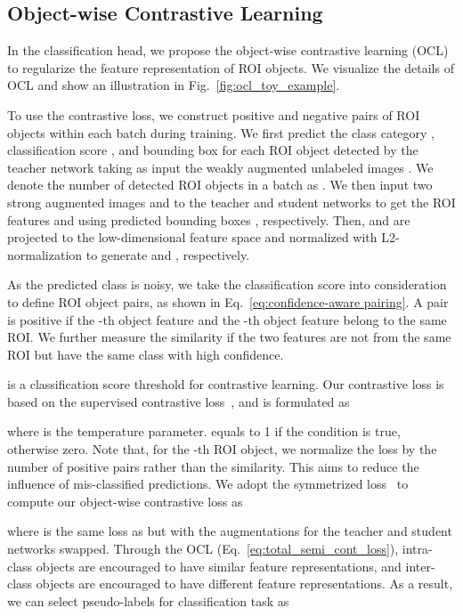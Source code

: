\documentclass{bmvc2k}
\begin{document}
\subsection{Object-wise Contrastive Learning}
\label{sec:contrastive}
In the classification head, we propose the object-wise contrastive learning (OCL) to regularize the feature representation of ROI objects. 
We visualize the details of OCL and show an illustration in Fig.~\ref{fig:ocl_toy_example}. 

To use the contrastive loss, we construct positive and negative pairs of ROI objects within each batch during training.
We first predict the class category , classification score , and bounding box  for each ROI object detected by the teacher network taking as input the weakly augmented unlabeled images . We denote the number of detected ROI objects in a batch as .
We then input two strong augmented images  and  to the teacher and student networks to get the ROI features  and  using predicted bounding boxes , respectively.
Then,  and  are projected to the low-dimensional feature space
and normalized with L2-normalization to generate  and , respectively.

As the predicted class is noisy, we take the classification score into consideration to define ROI object pairs, as 
shown in Eq.~\ref{eq:confidence-aware pairing}. 
A pair is positive if the -th object feature  and the -th object feature  belong to the same ROI.
We further measure the similarity if the two features are not from the same ROI but have the same class with high confidence.

 is a classification score threshold for contrastive learning. Our contrastive loss is based on the supervised contrastive loss~\cite{khosla2020supcont}, and is formulated as 

where  is the temperature parameter.  equals to 1 if the condition is true, otherwise zero.
Note that, for the -th ROI object, we normalize the loss by the number of positive pairs rather than the similarity. This aims to reduce the influence of mis-classified predictions.
We adopt the symmetrized loss~\cite{mocov3} to compute our object-wise contrastive loss as 

where  is the same loss as  but with the augmentations for the teacher and student networks swapped.
Through the OCL (Eq.~\ref{eq:total_semi_cont_loss}), intra-class objects are encouraged to have similar feature representations, and inter-class objects are encouraged to have different feature representations. 
As a result, we can select pseudo-labels for classification task as
\end{document}
